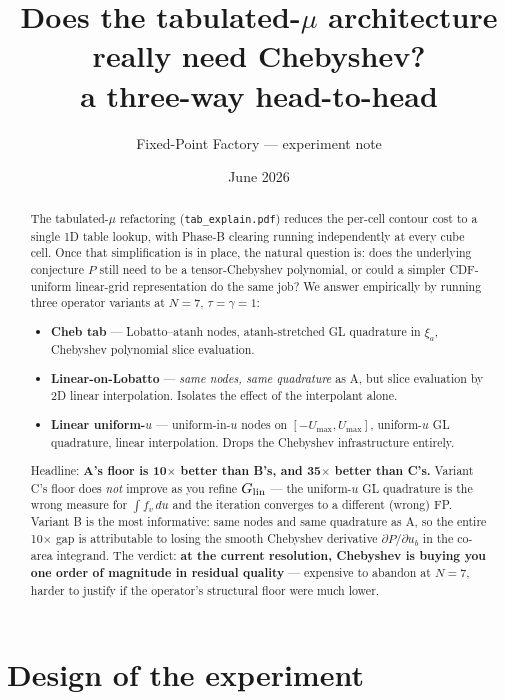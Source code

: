\documentclass[11pt]{article}
\title{Does the tabulated-$\mu$ architecture really need Chebyshev?\\
       a three-way head-to-head}
\author{Fixed-Point Factory --- experiment note}
\date{June 2026}
\begin{document}
\maketitle

\begin{abstract}
\noindent
The tabulated-$\mu$ refactoring (\texttt{tab\_explain.pdf}) reduces the
per-cell contour cost to a single 1D table lookup, with Phase-B clearing
running independently at every cube cell. Once that simplification is in
place, the natural question is: does the underlying conjecture $P$ still
need to be a tensor-Chebyshev polynomial, or could a simpler CDF-uniform
linear-grid representation do the same job? We answer empirically by
running three operator variants at $N{=}7$, $\tau{=}\gamma{=}1$:
\begin{itemize}
  \item[(A)] \textbf{Cheb tab} --- Lobatto--atanh nodes, atanh-stretched
        GL quadrature in $\xi_a$, Chebyshev polynomial slice evaluation.
  \item[(B)] \textbf{Linear-on-Lobatto} --- \emph{same nodes, same
        quadrature} as A, but slice evaluation by 2D linear
        interpolation. Isolates the effect of the interpolant alone.
  \item[(C)] \textbf{Linear uniform-$u$} --- uniform-in-$u$ nodes on
        $[-U_{\max}, U_{\max}]$, uniform-$u$ GL quadrature, linear
        interpolation. Drops the Chebyshev infrastructure entirely.
\end{itemize}
Headline: \textbf{A's floor is 10$\times$ better than B's, and 35$\times$
better than C's.} Variant C's floor does \emph{not} improve as you refine
$G_{\rm lin}$ --- the uniform-$u$ GL quadrature is the wrong measure for
$\int f_v\,du$ and the iteration converges to a different (wrong) FP.
Variant B is the most informative: same nodes and same quadrature as A,
so the entire 10$\times$ gap is attributable to losing the smooth Chebyshev
derivative $\partial P/\partial u_b$ in the co-area integrand. The
verdict: \textbf{at the current resolution, Chebyshev is buying you one
order of magnitude in residual quality} --- expensive to abandon at
$N{=}7$, harder to justify if the operator's structural floor were much
lower.
\end{abstract}

\section{Design of the experiment}
\end{document}

